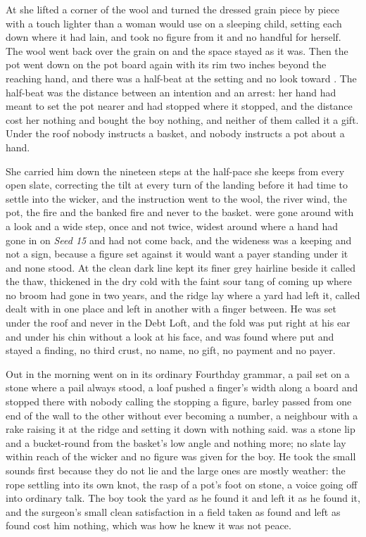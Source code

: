 At  she lifted a corner of the wool and turned the dressed grain piece by piece with a touch lighter than a woman would use on a sleeping child, setting each down where it had lain, and took no figure from it and no handful for herself. The wool went back over the grain on  and the space stayed as it was. Then the pot went down on the pot board again with its rim two inches beyond the reaching hand, and there was a half-beat at the setting and no look toward . The half-beat was the distance between an intention and an arrest: her hand had meant to set the pot nearer and had stopped where it stopped, and the distance cost her nothing and bought the boy nothing, and neither of them called it a gift. Under the roof nobody instructs a basket, and nobody instructs a pot about a hand.

She carried him down the nineteen steps at the half-pace she keeps from every open slate, correcting the tilt at every turn of the landing before it had time to settle into the wicker, and the instruction went to the wool, the river wind, the pot, the fire and the banked fire and never to the basket.  were gone around with a look and a wide step, once and not twice, widest around  where a hand had gone in on \emph{Seed 15} and had not come back, and the wideness was a keeping and not a sign, because a figure set against it would want a payer standing under it and none stood. At  the clean dark line kept its finer grey hairline beside it called the thaw, thickened in the dry cold with the faint sour tang of  coming up where no broom had gone in two years, and the ridge lay where a yard had left it, called dealt with in one place and left in another with a finger between. He was set under the roof and never in the Debt Loft, and the fold was put right at his ear and under his chin without a look at his face, and  was found where put and stayed a finding, no third crust, no name, no gift, no payment and no payer.

Out in  the morning went on in its ordinary Fourthday grammar, a pail set on a stone where a pail always stood, a loaf pushed a finger's width along a board and stopped there with nobody calling the stopping a figure, barley passed from one end of the wall to the other without ever becoming a number, a neighbour with a rake raising it at the ridge and setting it down with nothing said.  was a stone lip and a bucket-round from the basket's low angle and nothing more; no slate lay within reach of the wicker and no figure was given for the boy. He took the small sounds first because they do not lie and the large ones are mostly weather: the rope settling into its own knot, the rasp of a pot's foot on stone, a voice going off into ordinary talk. The boy took the yard as he found it and left it as he found it, and the surgeon's small clean satisfaction in a field taken as found and left as found cost him nothing, which was how he knew it was not peace.

